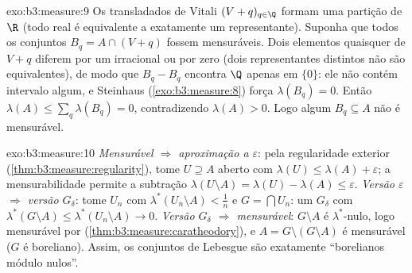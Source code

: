 \begin{solution}{exo:b3:measure:9}
Os transladados de Vitali $(V + q)_{q\in\Q}$ formam uma partição de $\R$ (todo
real é equivalente a exatamente um representante). Suponha que todos
os conjuntos $B_q = A \cap (V + q)$ fossem mensuráveis. Dois
elementos quaisquer de $V + q$ diferem por um irracional ou por zero (dois
representantes distintos não são equivalentes), de modo que $B_q - B_q$
encontra $\Q$ apenas em $\{0\}$: ele não contém intervalo algum, e
Steinhaus (\cref{exo:b3:measure:8}) força $\lambda(B_q) = 0$.
Então $\lambda(A) \leq \sum_{q}\lambda(B_q) = 0$, contradizendo
$\lambda(A) > 0$. Logo algum $B_q \subseteq A$ não é mensurável.
\end{solution}

\begin{solution}{exo:b3:measure:10}
\emph{Mensurável $\Rightarrow$ aproximação a $\varepsilon$}: pela
regularidade exterior (\cref{thm:b3:measure:regularity}), tome $U \supseteq A$ aberto com $\lambda(U) \leq \lambda(A) +
\varepsilon$; a mensurabilidade permite a subtração
$\lambda(U\setminus A) = \lambda(U) - \lambda(A) \leq
\varepsilon$. \emph{Versão $\varepsilon$ $\Rightarrow$
versão $G_\delta$}: tome $U_n$ com $\lambda^*(U_n\setminus
A) < \frac1n$ e $G = \bigcap U_n$: um $G_\delta$ com
$\lambda^*(G\setminus A) \leq \lambda^*(U_n\setminus A) \to 0$.
\emph{Versão $G_\delta$ $\Rightarrow$ mensurável}: $G\setminus
A$ é $\lambda^*$-nulo, logo mensurável por 
(\cref{thm:b3:measure:caratheodory}), e $A = G \setminus
(G\setminus A)$ é mensurável ($G$ é boreliano). Assim, os conjuntos de Lebesgue
são exatamente ``borelianos módulo nulos''.
\end{solution}

